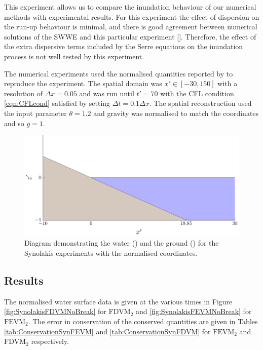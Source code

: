 This experiment allows us to compare the inundation behaviour of our numerical methods with experimental results. For this experiment the effect of dispersion on the run-up behaviour is minimal, and there is good agreement between numerical solutions of the SWWE and this particular experiment []. Therefore, the effect of the extra dispersive terms included by the Serre equations on the inundation process is not well tested by this experiment. 

The numerical experiments used the normalised quantities reported by \citet{Synolakis-1987-523} to reproduce the experiment. The spatial domain was $x' \in [-30,150]$ with a resolution of $\Delta x = 0.05$ and was run until $t' = 70$ with the CFL condition \eqref{eqn:CFLcond} satisfied by setting $\Delta t = 0.1 \Delta x$. The spatial reconstruction used the input parameter $\theta = 1.2$ and gravity was normalised to match the coordinates and so $g= 1$.


\begin{figure}
	\centering
	\includegraphics[width=\textwidth]{./chp6/figures/Experiment/Synolakis/WavetankArtifical.pdf}
	\caption{Diagram demonstrating the water () and the ground  () for the Synolakis experiments with the normalised coordinates.}
	\label{fig:SynolakisWT}
\end{figure}

\subsection{Results}




The normalised water surface data is given at the various times in Figure \ref{fig:SynolakisFDVMNoBreak} for $\text{FDVM}_2$ and \ref{fig:SynolakisFEVMNoBreak} for $\text{FEVM}_2$. The error in conservation of the conserved quantities are given in Tables \ref{tab:ConservationSynFEVM} and \ref{tab:ConservationSynFDVM} for $\text{FEVM}_2$ and $\text{FDVM}_2$ respectively. 

